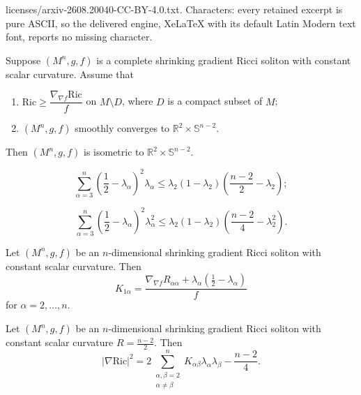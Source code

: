 \documentclass[10pt,a4paper]{amsart}
\newcommand{\Ric}{\mathrm{Ric}}
\begin{document}
licenses/arxiv-2608.20040-CC-BY-4.0.txt. Characters: every retained excerpt is pure ASCII, so the delivered engine, XeLaTeX with its default Latin Modern text font, reports no missing character.
\begin{theorem}\label{thm:main}
	Suppose $(M^n, g, f)$ is a complete shrinking gradient Ricci soliton with constant scalar curvature. Assume that
	\begin{enumerate}
		\item[(i)] $\Ric \geq \dfrac{\nabla_{\nabla f}\Ric}{f}$ on $M \setminus D$, where $D$ is a compact subset of $M$;
		\item[(ii)] $(M^n, g, f)$ smoothly converges to $\mathbb{R}^2 \times \mathbb{S}^{n-2}$.
	\end{enumerate}
	Then $(M^n, g, f)$ is isometric to $\mathbb{R}^2 \times \mathbb{S}^{n-2}$.
\end{theorem}

	\begin{equation}\label{l345}
		\sum_{\alpha=3}^n\left(\frac{1}{2} - \lambda_\alpha\right)^2\lambda_\alpha \leq \lambda_2(1 - \lambda_2)\left(\frac{n-2}{2} - \lambda_2\right);
	\end{equation}

	\begin{equation}\label{l345'}
		\sum_{\alpha=3}^n\left(\frac{1}{2} - \lambda_\alpha\right)^2\lambda_\alpha^2 \leq \lambda_2(1 - \lambda_2)\left(\frac{n-2}{4} - \lambda_2^2\right).
	\end{equation}

\begin{lem}\label{sectional-curvature}
	Let $(M^n, g, f)$ be an $n$-dimensional shrinking gradient Ricci soliton with constant scalar curvature. Then
	\begin{equation}\label{k1a}
		K_{1\alpha} = \frac{\nabla_{\nabla f}R_{\alpha\alpha} + \lambda_\alpha\left(\frac{1}{2} - \lambda_\alpha\right)}{f}
	\end{equation}
	for $\alpha = 2, \ldots, n$.
\end{lem}

\begin{lem}\label{lem:ricci-gradient}
	Let $(M^n, g, f)$ be an $n$-dimensional shrinking gradient Ricci soliton with constant scalar curvature $R = \frac{n-2}{2}$. Then
	\begin{equation*}\label{eq:ricci-gradient}
		|\nabla \mathrm{Ric}|^2 = 2\sum_{\substack{\alpha,\beta=2 \\ \alpha\neq\beta}}^n K_{\alpha\beta}\lambda_{\alpha}\lambda_{\beta} - \frac{n-2}{4}.
	\end{equation*}
\end{lem}
\end{document}
